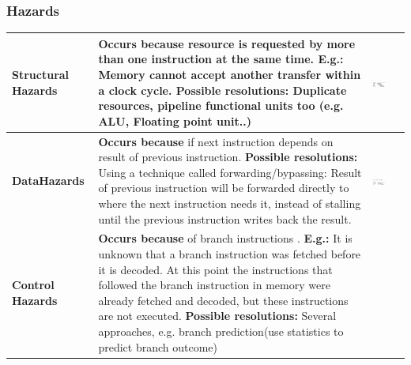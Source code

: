 		\subsubsection{Hazards}
			\begin{longtable}{|>{\bfseries}p{}|p{}|p{}|}
				\hline
				Structural Hazards
					& \textbf{Occurs because} resource is requested by more than one instruction at the same time.\newline
						\textbf{E.g.:} Memory cannot accept another transfer within a clock cycle.\newline
						\textbf{Possible resolutions:} Duplicate resources, pipeline functional units too (e.g. ALU, Floating point unit..)
						
					& \vspace{0pt}
					
						\includegraphics[width=0.45\textwidth]{./pictures/structuralHazard.png}\\
				\hline
				Data\newline Hazards
					& \textbf{Occurs because} if next instruction depends on result of previous instruction.\newline 
						\textbf{Possible resolutions:} Using a technique called forwarding/bypassing: Result of previous instruction will be forwarded directly to where the next instruction needs it, instead of stalling until the previous instruction writes back the result.
					& \vspace{0pt}
					
						\includegraphics[width=0.45\textwidth]{./pictures/dataHazard.png}\\
				\hline
				Control Hazards
					& \textbf{Occurs because} of branch instructions .\newline
						\textbf{E.g.:} It is unknown that a branch instruction was fetched before it is decoded. At this point the instructions that followed the branch instruction in memory were already fetched and decoded, but these instructions are not executed.\newline
						\textbf{Possible resolutions:} Several approaches, e.g. branch prediction(use statistics to predict branch outcome)
					& \vspace{0pt}
					

\end{longtable}
